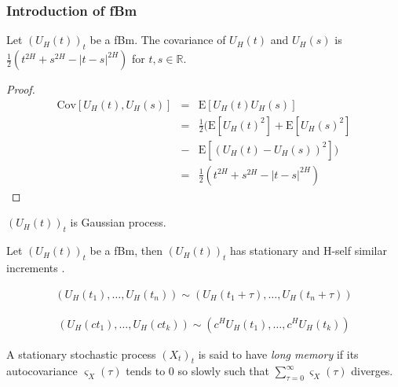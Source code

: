 \documentclass[12pt]{beamer}
\begin{document}
\frametitle{Introduction of fBm}
\begin{frame}
  \begin{theorem}
  Let  $(U_H(t))_{t}$ be a fBm. The covariance of $U_H(t)$ and $U_H(s)$ is $ \frac{1}{2}(t^{2H} + s^{2H} - |t-s|^{2H})$ for $t, s \in \mathbb{R}$.
\end{theorem}

\begin{proof}
  \begin{eqnarray}
	\mathrm{Cov}[U_H(t), U_H(s)] &=& \mathrm{E}[U_H(t)U_H(s)] \nonumber\\
	&=& \frac{1}{2}(\mathrm{E}[U_H(t)^2] + \mathrm{E}[U_H(s)^2] \nonumber\\
	&-& \mathrm{E}[(U_H(t) - U_H(s))^2]) \nonumber\\
	&=& \frac{1}{2}(t^{2H} + s^{2H} - |t-s|^{2H})
	\label{sec:eqn4}
  \end{eqnarray}
\end{proof}
\end{frame}

\begin{frame}
 \begin{theorem}
  $(U_H(t))_{t}$ is Gaussian process.
\end{theorem}
\begin{theorem}
   Let $(U_H(t))_{t}$ be a fBm, then $(U_H(t))_{t}$ has stationary and H-self similar increments .
\end{theorem} 
\end{frame}

\begin{frame}
  \begin{theorem}
	\begin{eqnarray*}
	   (U_H(t_1),\dots,U_H(t_n)) \sim (U_H(t_1+\tau),\dots,U_H(t_n+\tau))
	\end{eqnarray*}
  \end{theorem}
  \begin{theorem}
\begin{eqnarray*}
  (U_H(ct_1),\dots, U_H(ct_k)) \sim (c^H U_H(t_1),\dots, c^H U_H(t_k))
\end{eqnarray*}
  \end{theorem}
\end{frame}

\begin{frame}
  \begin{definition}
  A stationary stochastic process $(X_t)_t$ is said to have \emph{long memory} if its autocovariance $\varsigma_X(\tau)$ tends to $0$ so slowly such that
  $ \sum_{\tau = 0} ^{\infty} \varsigma_X(\tau)$ diverges.
\end{definition}
\end{frame}
\end{document}
